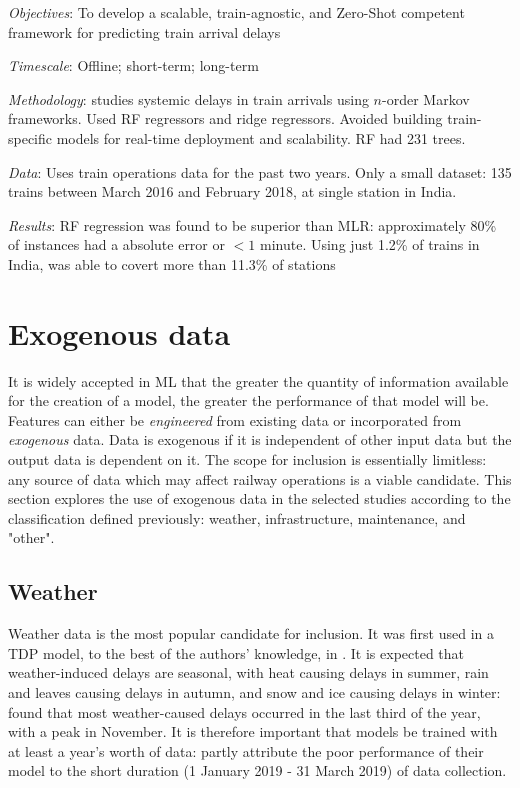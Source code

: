 \documentclass{article}
\begin{document}
\textit{Objectives}: To develop a scalable, train-agnostic, and Zero-Shot competent framework for predicting train arrival delays

\smallskip

\textit{Timescale}: Offline; short-term; long-term

\smallskip

\textit{Methodology}: studies systemic delays in train arrivals using $n$-order Markov frameworks. Used RF regressors and ridge regressors. Avoided building train-specific models for real-time deployment and scalability. RF had 231 trees.

\smallskip

\textit{Data}: Uses train operations data for the past two years. Only a small dataset: 135 trains between March 2016 and February 2018, at single station in India. 

\smallskip

\textit{Results}: RF regression was found to be superior than MLR: approximately 80\% of instances had a absolute error or $< 1$ minute. Using just 1.2\% of trains in India, was able to covert more than 11.3\% of stations

\clearpage
\section{Exogenous data}

It is widely accepted in ML that the greater the quantity of information available for the creation of a model, the greater the performance of that model will be. Features can either be \textit{engineered} from existing data or incorporated from \textit{exogenous} data. Data is exogenous if it is independent of other input data but the output data is dependent on it. The scope for inclusion is essentially limitless: any source of data which may affect railway operations is a viable candidate. This section explores the use of exogenous data in the selected studies according to the classification defined previously: weather, infrastructure, maintenance, and "other".

\subsection{Weather}

Weather data is the most popular candidate for inclusion. It was first used in a TDP model, to the best of the authors' knowledge, in \cite{oneto_et_al_2016}. It is expected that weather-induced delays are seasonal, with heat causing delays in summer, rain and leaves causing delays in autumn, and snow and ice causing delays in winter: \cite{brazil_2017} found that most weather-caused delays occurred in the last third of the year, with a peak in November. It is therefore important that models be trained with at least a year's worth of data: \cite{wang_et_al_2019} partly attribute the poor performance of their model to the short duration (1 January 2019 - 31 March 2019) of data collection. 
\end{document}
